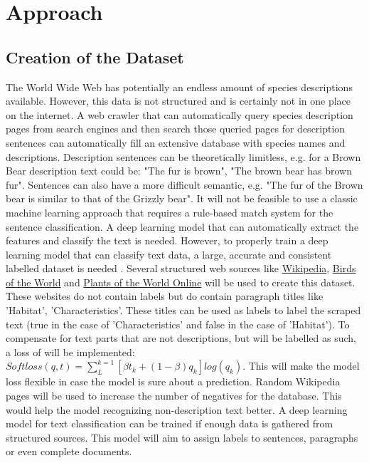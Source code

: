 \documentclass{article}
\begin{document}
\section{Approach} 
\subsection{Creation of the Dataset}
The World Wide Web has potentially an endless amount of species descriptions available.
However, this data is not structured and is certainly not in one place on the internet.
A web crawler that can automatically query species description pages from search engines and then search those queried pages for description sentences can automatically fill an extensive database with species names and descriptions. 
Description sentences can be theoretically limitless, e.g. for a Brown Bear description text could be: "The fur is brown", "The brown bear has brown fur".
Sentences can also have a more difficult semantic, e.g. "The fur of the Brown bear is similar to that of the Grizzly bear".
It will not be feasible to use a classic machine learning approach that requires a rule-based match system for the sentence classification. 
A deep learning model that can automatically extract the features and classify the text is needed.
However, to properly train a deep learning model that can classify text data, a large, accurate and consistent labelled dataset is needed \autocite{munappy_data_2019}.
Several structured web sources like \href{http://www.Wikipedia.com}{Wikipedia}, \href{https://birdsoftheworld.org}{Birds of the World} and \href{http://powo.science.kew.org/}{Plants of the World Online} will be used to create this dataset.
These websites do not contain labels but do contain paragraph titles like 'Habitat', 'Characteristics'. 
These titles can be used as labels to label the scraped text (true in the case of 'Characteristics' and false in the case of 'Habitat').
To compensate for text parts that are not  descriptions, but will be labelled as such, a loss of \textcite{reed_training_2015} will be implemented: \( Softloss(q, t) =  \sum_{L}^{k=1} [\beta t _k + (1- \beta )q _k]log(q _k) \).
This will make the model loss flexible in case the model is sure about a prediction.
Random Wikipedia pages will be used to increase the number of negatives for the database.
This would help the model recognizing non-description text better.
A deep learning model for text classification can be trained if enough data is gathered from structured sources.
This model will aim to assign labels to sentences, paragraphs or even complete documents. 
\end{document}
